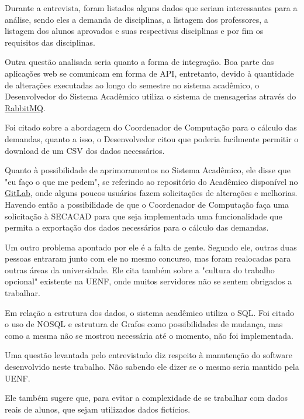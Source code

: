         Durante a entrevista, foram listados alguns dados que seriam interessantes para a análise, sendo eles a demanda de disciplinas, a listagem dos professores, a listagem dos alunos aprovados e suas respectivas disciplinas e por fim os requisitos das disciplinas.


        Outra questão analisada seria quanto a forma de integração. Boa parte das aplicações web se comunicam em forma de API, entretanto, devido à quantidade de alterações executadas ao longo do semestre no sistema acadêmico, o Desenvolvedor do Sistema Acadêmico utiliza o sistema de mensagerias através do \href{https://www.rabbitmq.com/}{RabbitMQ}.

        Foi citado sobre a abordagem do Coordenador de Computação para o cálculo das demandas, quanto a isso, o Desenvolvedor citou que poderia facilmente permitir o download de um CSV dos dados necessários.

        Quanto à possibilidade de aprimoramentos no Sistema Acadêmico, ele disse que "eu faço o que me pedem", se referindo ao repositório do Acadêmico disponível no \href{https://about.gitlab.com/}{GitLab}, onde alguns poucos usuários fazem solicitações de alterações e melhorias. Havendo então a possibilidade de que o Coordenador de Computação faça uma solicitação à SECACAD para que seja implementada uma funcionalidade que permita a exportação dos dados necessários para o cálculo das demandas.

        Um outro problema apontado por ele é a falta de gente. Segundo ele, outras duas pessoas entraram junto com ele no mesmo concurso, mas foram realocadas para outras áreas da universidade. Ele cita também sobre a "cultura do trabalho opcional" existente na UENF, onde muitos servidores não se sentem obrigados a trabalhar.

        Em relação a estrutura dos dados, o sistema acadêmico utiliza o SQL. Foi citado o uso de NOSQL e estrutura de Grafos como possibilidades de mudança, mas como a mesma não se mostrou necessária até o momento, não foi implementada.

        Uma questão levantada pelo entrevistado diz respeito à manutenção do software desenvolvido neste trabalho. Não sabendo ele dizer se o mesmo seria mantido pela UENF.

        Ele também sugere que, para evitar a complexidade de se trabalhar com dados reais de alunos, que sejam utilizados dados fictícios.

